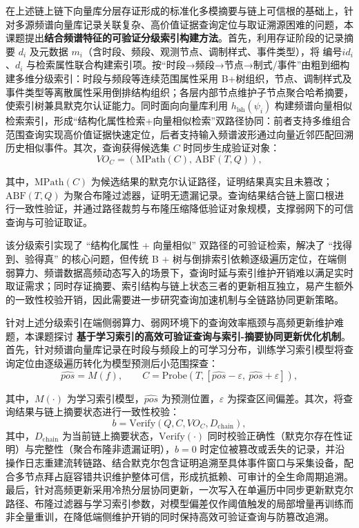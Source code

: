 在上述链上链下向量库分层存证形成的标准化多模摘要与链上可信根的基础上，针对多源频谱向量库记录关联复杂、高价值证据查询定位与取证溯源困难的问题，本课题提出\textbf{结合频谱特征的可验证分级索引构建方法}。首先，利用存证阶段的记录摘要 $d_i$ 及元数据 $m_i$（含时段、频段、观测节点、调制样式、事件类型），将 编号$id_i$、$d_i$ 与检索属性联合构建索引项。按“时段→频段→节点→制式/事件”由粗到细构建多维分级索引：时段与频段等连续范围属性采用 B+树组织，节点、调制样式及事件类型等离散属性采用倒排结构组织；各层内部节点维护子节点聚合哈希摘要，使索引树兼具默克尔认证能力。同时面向向量库利用 $h_{\mathrm{lsh}}(\psi_i)$ 构建频谱向量相似检索索引，形成“结构化属性检索+向量相似检索”双路径协同：前者支持多维组合范围查询实现高价值证据快速定位，后者支持输入频谱波形通过向量近邻匹配回溯历史相似事件。其次，查询获得候选集 $C$ 时同步生成验证对象：
\begin{equation}
	VO_C=\left(\mathrm{MPath}(C),\, \mathrm{ABF}(T,Q)\right),
\end{equation}

其中，$\mathrm{MPath}(C)$ 为候选结果的默克尔认证路径，证明结果真实且未篡改；$\mathrm{ABF}(T,Q)$ 为聚合布隆过滤器，证明无遗漏记录。查询结果结合链上窗口根进行一致性验证，并通过路径裁剪与布隆压缩降低验证对象规模，支撑弱网下的可信查询与可验证取证。


该分级索引实现了 “结构化属性 + 向量相似” 双路径的可验证检索，解决了 “找得到、验得真” 的核心问题，但传统 B + 树与倒排索引依赖逐级遍历定位，在端侧弱算力、频谱数据高频动态写入的场景下，查询时延与索引维护开销难以满足实时取证需求；同时存证摘要、索引结构与链上状态三者的更新相互独立，易产生额外的一致性校验开销，因此需要进一步研究查询加速机制与全链路协同更新策略。

针对上述分级索引在端侧弱算力、弱网环境下的查询效率瓶颈与高频更新维护难题，本课题探讨
\textbf{基于学习索引的高效可验证查询与索引-摘要协同更新优化机制}。首先，针对频谱向量库记录在时段与频段上的可学习分布，训练学习索引模型将查询定位由逐级遍历转化为模型预测后小范围探查：
\begin{equation}
	\widehat{pos}=M(f),\qquad C=\mathrm{Probe}\!\left(T,\left[\widehat{pos}-\varepsilon,\ \widehat{pos}+\varepsilon\right]\right),
\end{equation}

其中，$M(\cdot)$ 为学习索引模型，$\widehat{pos}$ 为预测位置，$\varepsilon$ 为探查区间偏差。其次，将查询结果与链上摘要状态进行一致性校验：
\begin{equation}
	b=\mathrm{Verify}\!\left(Q,C,VO_C,D_{\mathrm{chain}}\right),
\end{equation}
其中，$D_{\mathrm{chain}}$ 为当前链上摘要状态，$\mathrm{Verify}(\cdot)$ 同时校验正确性（默克尔存在性证明）与完整性（聚合布隆非遗漏证明），$b=0$ 时定位被篡改或丢失的记录，并沿操作日志重建流转链路、结合默克尔包含证明追溯至具体事件窗口与采集设备，配合多节点拜占庭容错共识维护整体可信，形成抗抵赖、可审计的全生命周期追溯。最后，针对高频更新采用冷热分层协同更新，一次写入在单遍历中同步更新默克尔路径、布隆过滤器与学习索引参数，对模型偏差仅作阈值触发的局部增量再训练而非全量重训，在降低端侧维护开销的同时保持高效可验证查询与防篡改追溯。



